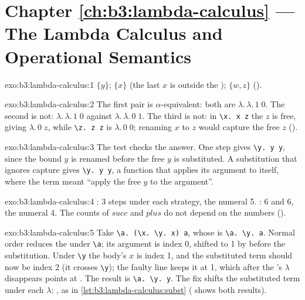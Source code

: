 \section*{Chapter \ref{ch:b3:lambda-calculus} --- The Lambda Calculus and Operational Semantics}

\begin{solution}{exo:b3:lambda-calculus:1}
$\{y\}$; $\{x\}$ (the last $x$ is outside the ); $\{w, z\}$ ().
\end{solution}

\begin{solution}{exo:b3:lambda-calculus:2}
The first pair is $\alpha$-equivalent: both are $\lambda.\,\lambda.\,1\;0$. The second is not: $\lambda.\,\lambda.\,1\;0$ against $\lambda.\,\lambda.\,0\;1$. The third is not: in \texttt{\textbackslash{}x.\ x z} the $z$ is free, giving $\lambda.\,0\;z$, while \texttt{\textbackslash{}z.\ z z} is $\lambda.\,0\;0$; renaming $x$ to $z$ would capture the free $z$ ().
\end{solution}

\begin{solution}{exo:b3:lambda-calculus:3}
The test  checks the answer. One step gives \texttt{\textbackslash{}y\textquotesingle{}.\ y y\textquotesingle{}}, since the bound $y$ is renamed before the free $y$ is substituted. A substitution that ignores capture gives \texttt{\textbackslash{}y.\ y y}, a function that applies its argument to itself, where the term meant ``apply the free $y$ to the argument''.
\end{solution}

\begin{solution}{exo:b3:lambda-calculus:4}
: 3 steps under each strategy, the numeral 5. : 6 and 6, the numeral 4. The counts of $\mathit{succ}$ and $\mathit{plus}$ do not depend on the numbers ().
\end{solution}

\begin{solution}{exo:b3:lambda-calculus:5}
Take \texttt{\textbackslash{}a.\ (\textbackslash{}x.\ \textbackslash{}y.\ x) a}, whose  is \texttt{\textbackslash{}a.\ \textbackslash{}y.\ a}. Normal order reduces the  under \texttt{\textbackslash{}a}; its argument is index 0, shifted to 1 by  before the substitution. Under \texttt{\textbackslash{}y} the body's $x$ is index 1, and the substituted term should now be index 2 (it crosses \texttt{\textbackslash{}y}); the faulty line keeps it at 1, which after the 's $\lambda$ disappears points at . The result is \texttt{\textbackslash{}a.\ \textbackslash{}y.\ y}. The fix shifts the substituted term under each $\lambda$: , as in \cref{lst:b3:lambda-calculus:subst} ( shows both results).
\end{solution}


